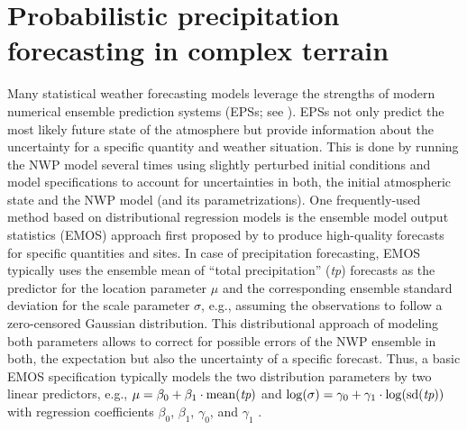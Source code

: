 \documentclass[aoas, preprint]{imsart}
\numberwithin{equation}{subsection}
\begin{document}
\section{Probabilistic precipitation forecasting in complex terrain}
\label{sec:precipitation}

Many statistical weather forecasting models leverage the strengths of modern
numerical ensemble prediction systems (EPSs; see \citealp{Bauer+Thorpe+Brunet:2015}).
EPSs not only predict the most likely future state of the atmosphere but provide
information about the uncertainty for a specific quantity and weather situation.
This is done by running the NWP model several times using slightly perturbed 
initial conditions and model specifications to account for uncertainties in both,
the initial atmospheric state and the NWP model (and its parametrizations).
One frequently-used method based on distributional regression models is the 
ensemble model output statistics (EMOS) approach first proposed by
\cite{Gneiting+Raftery+Westveld:2005} to produce high-quality forecasts for
specific quantities and sites.  
In case of precipitation forecasting, EMOS typically uses the ensemble mean of 
``total precipitation'' (\emph{tp}) forecasts as the predictor for the location 
parameter $\mu$ and the corresponding ensemble standard deviation for the 
scale parameter $\sigma$, e.g., assuming the observations to follow a zero-censored
Gaussian distribution.
This distributional approach of modeling both parameters allows to correct 
for possible errors of the NWP ensemble in both, the expectation but also the 
uncertainty of a specific forecast. Thus, a basic EMOS specification typically
models the two distribution parameters by two linear predictors, e.g., 
$\mu = \beta_0 + \beta_1 \cdot \mathrm{mean}(\emph{tp})$ and  
$\log(\sigma) = \gamma_0 + \gamma_1 \cdot \log(\mathrm{sd}(\emph{tp}))$
with regression coefficients $\beta_0$, $\beta_1$, $\gamma_0$, and $\gamma_1$
\citep[where the log link assures positivity of the scale parameter, following][]{Gebetsberger+Messner+Mayr:2017}.

%
\end{document}
